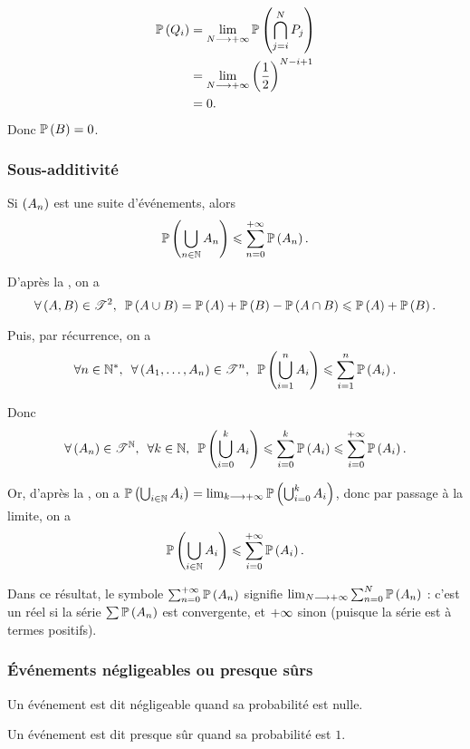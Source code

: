 \begin{corr}
\begin{itemize}
\[\begin{aligned}
        \mathbb{P}\left(Q_i\right)&=\lim_{N\longrightarrow+\infty}\mathbb{P}\left(\bigcap_{j=i}^NP_j\right) \\
        &=\lim_{N\longrightarrow+\infty}\left(\dfrac{1}{2}\right)^{N-i+1} \\
        &=0.
    \end{aligned}\] Donc \(\mathbb{P}\left(B\right)=0\).
\end{itemize}
\end{corr}

\subsubsection{Sous-additivité}

\begin{prop}
Si \(\left(A_n\right)\) est une suite d'événements, alors \[\mathbb{P}\left(\bigcup_{n\in\mathbb{N}}A_n\right)\leqslant\sum_{n=0}^{+\infty}\mathbb{P}\left(A_n\right).\]
\end{prop}

\begin{dem}
D'après la , on a \[\quantifs{\forall\paren{A,B}\in\fami{T}^2}\proba{A\union B}=\proba{A}+\proba{B}-\proba{A\inter B}\leq\proba{A}+\proba{B}.\]

Puis, par récurrence, on a \[\quantifs{\forall n\in\Ns;\forall\paren{A_1,\dots,A_n}\in\fami{T}^n}\proba{\bigunion_{i=1}^nA_i}\leq\sum_{i=1}^n\proba{A_i}.\]

Donc \[\quantifs{\forall\paren{A_n}\in\fami{T}^\N;\forall k\in\N}\proba{\bigunion_{i=0}^kA_i}\leq\sum_{i=0}^k\proba{A_i}\leq\sum_{i=0}^{\pinf}\proba{A_i}.\]

Or, d'après la , on a \(\mathbb{P}\left(\bigcup_{i\in\mathbb{N}}A_i\right)=\lim_{k\longrightarrow+\infty}\mathbb{P}\left(\bigcup_{i=0}^kA_i\right)\), donc par passage à la limite, on a \[\mathbb{P}\left(\bigcup_{i\in\mathbb{N}}A_i\right)\leqslant\sum_{i=0}^{+\infty}\mathbb{P}\left(A_i\right).\]
\end{dem}

Dans ce résultat, le symbole \(\sum_{n=0}^{+\infty}\mathbb{P}\left(A_n\right)\) signifie \(\lim_{N\longrightarrow+\infty}\sum_{n=0}^N\mathbb{P}\left(A_n\right)\) : c'est un réel si la série \(\sum\mathbb{P}\left(A_n\right)\) est convergente, et \(+\infty\) sinon (puisque la série est à termes positifs).

\subsubsection{Événements négligeables ou presque sûrs}

\begin{defi}
Un événement est dit négligeable quand sa probabilité est nulle.

Un événement est dit presque sûr quand sa probabilité est \(1\).
\end{defi}

